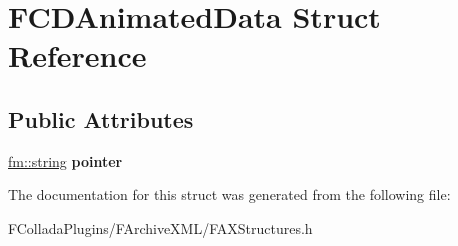 \hypertarget{structFCDAnimatedData}{
\section{FCDAnimatedData Struct Reference}
\label{structFCDAnimatedData}
}
\subsection*{Public Attributes}
\begin{DoxyCompactItemize}
\item 
\hypertarget{structFCDAnimatedData_a91903e493b45979188bbd484bbd8b8fa}{
\hyperlink{classfm_1_1stringT}{fm::string} {\bfseries pointer}}
\label{structFCDAnimatedData_a91903e493b45979188bbd484bbd8b8fa}

\end{DoxyCompactItemize}


The documentation for this struct was generated from the following file:\begin{DoxyCompactItemize}
\item 
FColladaPlugins/FArchiveXML/FAXStructures.h\end{DoxyCompactItemize}
